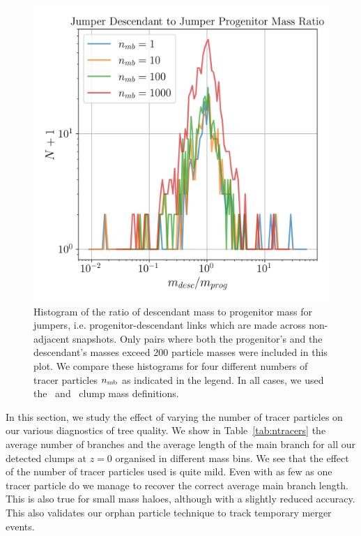 \begin{figure}
  \centering
  \includegraphics[width=.9\linewidth, keepaspectratio]{images/tree-statistics-my-threshold/jumper_mass_ratio-ntrace.png}%
  \caption{ Histogram of the ratio of descendant mass to progenitor
    mass for jumpers, i.e.  progenitor-descendant links which are made
    across non-adjacent snapshots.  Only pairs where both the
    progenitor's and the descendant's masses exceed 200 particle
    masses were included in this plot.  We compare these histograms
    for four different numbers of tracer particles $n_{\rm mb}$ as
    indicated in the legend.  In all cases, we used the \exc\ and
    \sad\ clump mass definitions.
  }%
  \label{fig:jumper-mass-ratio}
\end{figure}


In this section, we study the effect of varying the number of tracer
particles on our various diagnostics of tree quality. We show in
Table~\ref{tab:ntracers} the average number of branches and the
average length of the main branch for all our detected clumps at $z=0$
organised in different mass bins. We see that the effect of the number
of tracer particles used is quite mild. Even with as few as one tracer
particle do we manage to recover the correct average main branch
length. This is also true for small mass haloes, although with a
slightly reduced accuracy. This also validates our orphan particle
technique to track temporary merger events.


